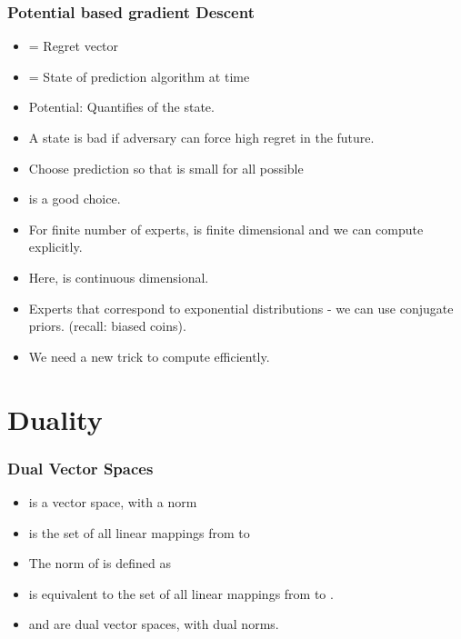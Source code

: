 \documentclass[handout]{beamer}
\begin{document}
\begin{frame}
  \frametitle{Potential based gradient Descent}
  \begin{itemize}
  \item {} = Regret vector 
  \item {} = State of prediction algorithm at time 
  \item Potential: \R{$\Phi(\RR)$} Quantifies  of the
    state.
  \item A state is bad if adversary can force high regret in the future.
  \item Choose prediction  so that  is small for all possible 
  \item {} is a good choice.
  \item For finite number of experts,  is finite
    dimensional and we can compute  explicitly.
  \item Here,  is continuous
    dimensional.
  \item Experts that correspond to exponential distributions - we can
    use conjugate priors. (recall: biased coins).
  \item We need a new trick to compute  efficiently.
  \end{itemize}
\end{frame}

\section{Duality}

\begin{frame}
\frametitle{Dual Vector Spaces}

\begin{itemize}
\item {} is a vector space, with a norm 
\item {} is the set of all linear mappings from  to
  \item
  The norm of  is defined as
\item {} is equivalent to the set of all linear mappings from  to
  .
\item {} and  are dual vector spaces, with dual norms. 
\end{itemize}
\end{frame}
\end{document}
